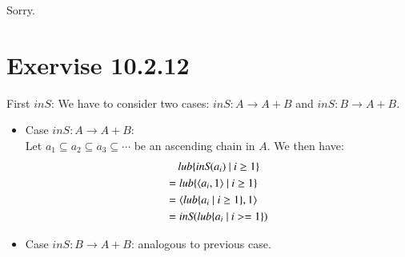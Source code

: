 \documentclass{article}[12pt]
\newcommand{\lub}{\ensuremath{\textit{}{lub}}}
\newcommand{\inS}{\ensuremath{\textit{inS}}}
\begin{document}
Sorry.

\section{Exervise 10.2.12}

First $\inS$: We have to consider two cases: $\inS : A \rightarrow A + B$ and $\inS : B \rightarrow A + B$.\\
\begin{itemize}
    \item Case $\inS: A \rightarrow A + B$:\\
    Let $a_1 \subseteq a_2 \subseteq a_3 \subseteq \cdots$ be an ascending chain in $A$.
    We then have:
    \begin{align*}
        &\mathbin{\hphantom{=}} \lub\{\inS(a_i)\ |\ i \geq 1\}\\
        &= \lub\{ \langle a_i,1 \rangle\ |\ i \geq 1 \}\\
        &= \langle \lub\{a_i\ |\ i \geq 1\}, 1 \rangle\\
        &= \inS(\lub\{a_i\ |\ i >= 1\}) 
    \end{align*}
    \item Case $\inS : B \rightarrow A + B$: analogous to previous case.
\end{itemize}
\end{document}
